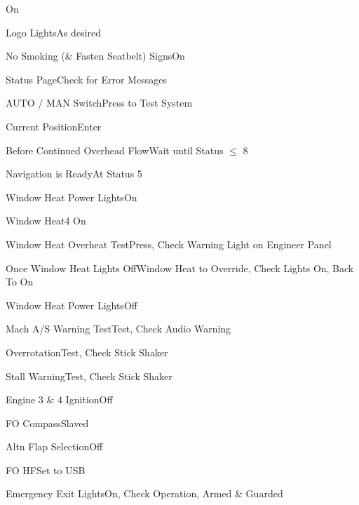 \documentclass[sim-use, blue_items]{checklist}
\begin{document}
\begin{continuedchecklist}
	 {On}
	\item{Logo Lights}{As desired}
	\item{No Smoking (\& Fasten Seatbelt) Signs}{On}
	
	 {
		\item{Status Page}{Check for Error Messages}
		\item{AUTO / MAN Switch}{Press to Test System}
		\item{Current Position}{Enter}
		\item{Before Continued Overhead Flow}{Wait until Status $\le$ 8}
		\item{Navigation is Ready}{At Status 5}
	}
	
	 {
		\item{Window Heat Power Lights}{On}
		\item{Window Heat}{4 On}
		\item{Window Heat Overheat Test}{Press, Check Warning Light on Engineer Panel}
		\item{Once Window Heat Lights Off}{Window Heat to Override, Check Lights On, Back To On}
		\item{Window Heat Power Lights}{Off}
	}
	
	
	 {
		\item{Mach A/S Warning Test}{Test, Check Audio Warning}
		\item{Overrotation}{Test, Check Stick Shaker}
		\item{Stall Warning}{Test, Check Stick Shaker}
	}
	
	 {
		\item{Engine 3 \& 4 Ignition}{Off}
		\item{FO Compass}{Slaved}
		\item{Altn Flap Selection}{Off}
		\item{FO HF}{Set to USB}
	}
	
	\item{Emergency Exit Lights}{On, Check Operation, Armed \& Guarded}
\end{continuedchecklist}
\end{document}

